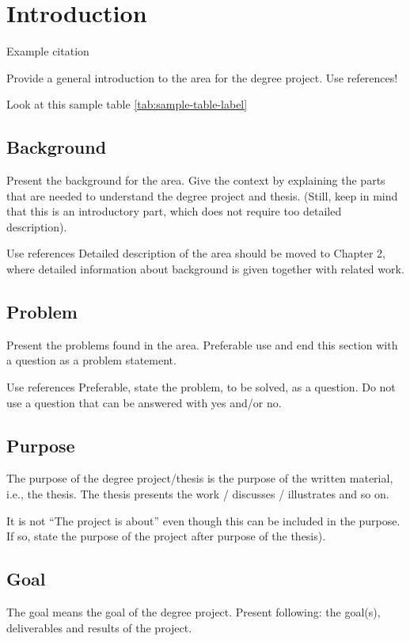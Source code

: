 \section{Introduction }

Example citation \cite{Jones2017}

Provide a general introduction to the area for the degree project. Use references!

Look at this sample table \ref{tab:sample-table-label}



\subsection{Background}
Present the background for the area. Give the context by explaining the parts that are needed to understand the degree project and thesis. (Still, keep in mind that this is an introductory part, which does not require too detailed description).

Use references
Detailed description of the area should be moved to Chapter 2, where detailed information about background is given together with related work. 

\subsection{Problem}
Present the problems found in the area. Preferable use and end this section with a question as a problem statement.

Use references
Preferable, state the problem, to be solved, as a question. Do not use a question that can be answered with yes and/or no. 

\subsection{Purpose}
The purpose of the degree project/thesis is the purpose of the written material, i.e., the thesis. The thesis presents the work / discusses / illustrates and so on.

It is not “The project is about” even though this can be included in the purpose. If so, state the purpose of the project after purpose of the thesis).

\subsection{Goal}
The goal means the goal of the degree project. Present following: the goal(s), deliverables and results of the project. 

